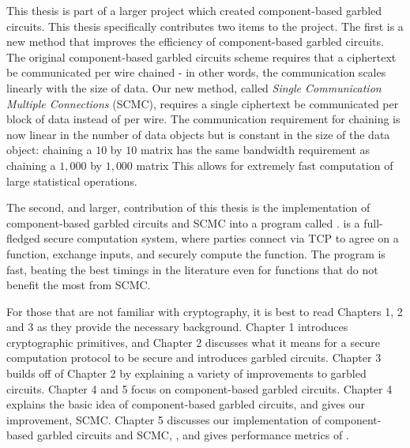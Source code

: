 This thesis is part of a larger project which created component-based garbled circuits.
This thesis specifically contributes two items to the project.
The first is a new method that improves the efficiency of component-based garbled circuits. 
The original component-based garbled circuits scheme requires that a ciphertext be communicated per wire chained - in other words, the communication scales linearly with the size of data.
Our new method, called \textit{Single Communication Multiple Connections} (SCMC), requires a single ciphertext be communicated per block of data instead of per wire. 
The communication requirement for chaining is now linear in the number of data objects but is constant in the size of the data object: chaining a $10$ by $10$ matrix has the same bandwidth requirement as chaining a $1,000$ by $1,000$ matrix 
This allows for extremely fast computation of large statistical operations. 

The second, and larger, contribution of this thesis is the implementation of component-based garbled circuits and SCMC into a program called \CompGC. 
\CompGC is a full-fledged secure computation system, where parties connect via TCP to agree on a function, exchange inputs, and securely compute the function.
The program is fast, beating the best timings in the literature even for functions that do not benefit the most from SCMC.

For those that are not familiar with cryptography, it is best to read Chapters 1, 2 and 3 as they provide the necessary background.
Chapter 1 introduces cryptographic primitives, and Chapter 2 discusses what it means for a secure computation protocol to be secure and introduces garbled circuits.
Chapter 3 builds off of Chapter 2 by explaining a variety of improvements to garbled circuits.
Chapter 4 and 5 focus on component-based garbled circuits.
Chapter 4 explains the basic idea of component-based garbled circuits, and gives our improvement, SCMC.
Chapter 5 discusses our implementation of component-based garbled circuits and SCMC, \CompGC, and gives performance metrics of \CompGC.







